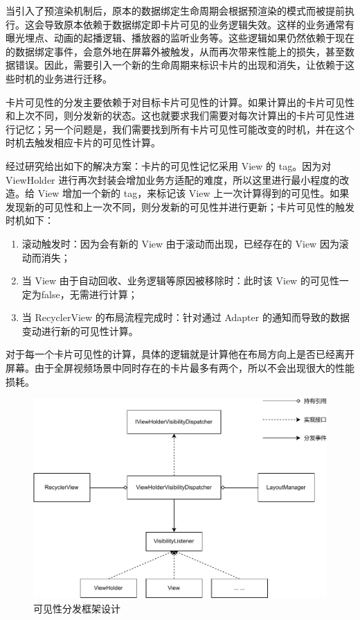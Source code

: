 当引入了预渲染机制后，原本的数据绑定生命周期会根据预渲染的模式而被提前执行。这会导致原本依赖于数据绑定即卡片可见的业务逻辑失效。这样的业务通常有曝光埋点、动画的起播逻辑、播放器的监听业务等。这些逻辑如果仍然依赖于现在的数据绑定事件，会意外地在屏幕外被触发，从而再次带来性能上的损失，甚至数据错误。因此，需要引入一个新的生命周期来标识卡片的出现和消失，让依赖于这些时机的业务进行迁移。

卡片可见性的分发主要依赖于对目标卡片可见性的计算。如果计算出的卡片可见性和上次不同，则分发新的状态。这也就要求我们需要对每次计算出的卡片可见性进行记忆；另一个问题是，我们需要找到所有卡片可见性可能改变的时机，并在这个时机去触发相应卡片的可见性计算。

经过研究给出如下的解决方案：卡片的可见性记忆采用 View 的 tag。因为对 ViewHolder 进行再次封装会增加业务方适配的难度，所以这里进行最小程度的改造。给 View 增加一个新的 tag，来标记该 View 上一次计算得到的可见性。如果发现新的可见性和上一次不同，则分发新的可见性并进行更新；卡片可见性的触发时机如下：

\begin{enumerate}
    \item 滚动触发时：因为会有新的 View 由于滚动而出现，已经存在的 View 因为滚动而消失；
    \item 当 View 由于自动回收、业务逻辑等原因被移除时：此时该 View 的可见性一定为false，无需进行计算；
    \item 当 RecyclerView 的布局流程完成时：针对通过 Adapter 的通知而导致的数据变动进行新的可见性计算。
\end{enumerate}

对于每一个卡片可见性的计算，具体的逻辑就是计算他在布局方向上是否已经离开屏幕。由于全屏视频场景中同时存在的卡片最多有两个，所以不会出现很大的性能损耗。



\begin{figure}
    \centering
    \begin{adjustbox}{max width=\textwidth}
        \includegraphics{assets/visibility-dispatch-framework.pdf}
    \end{adjustbox}
    \caption{可见性分发框架设计}
\end{figure}

